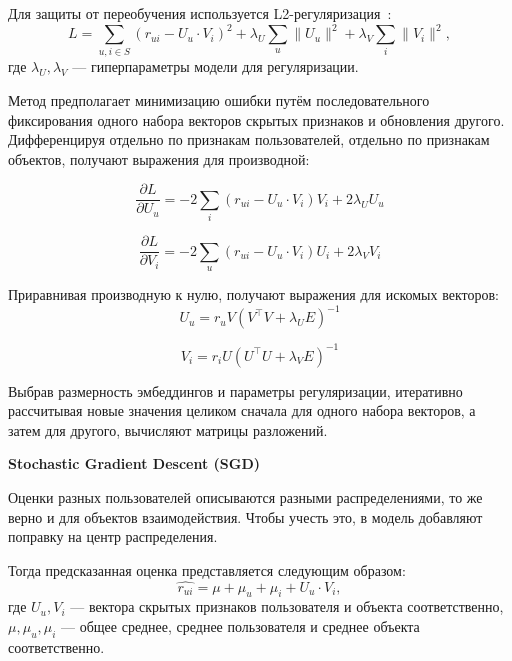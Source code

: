 Для защиты от переобучения используется L2-регуляризация~\cite{l-reg}:
\begin{equation}\label{eq:3}
        L = \sum_{u, i\in S}{(r_{ui} - U_{u} \cdot V_{i}) ^ 2} + \lambda_{U}\sum_{u}{\|U_{u}\| ^ 2} + \lambda_{V}\sum_{i}{\|V_{i}\| ^ 2},
\end{equation}
где $\lambda_{U}, \lambda_{V}$ --- гиперпараметры модели для регуляризации.


Метод предполагает минимизацию ошибки путём последовательного фиксирования одного набора векторов скрытых признаков и обновления другого.
Дифференцируя отдельно по признакам пользователей, отдельно по признакам объектов, получают выражения для производной:

\begin{equation}\label{eq:4}
        \frac{\partial L}{\partial U_{u}} = -2\sum_{i}{(r_{ui} - U_{u} \cdot V_{i})V_{i} + 2 \lambda_{U}U_{u}}
\end{equation}

\begin{equation}\label{eq:5}
        \frac{\partial L}{\partial V_{i}} = -2\sum_{u}{(r_{ui} - U_{u} \cdot V_{i})U_{i} + 2 \lambda_{V}V_{i}}
\end{equation}

Приравнивая производную к нулю, получают выражения для искомых векторов:
\begin{equation}\label{eq:6}
        U_{u} = r_{u}V(V^\intercal V + \lambda_{U} E)^{-1}
\end{equation}

\begin{equation}\label{eq:7}
        V_{i} = r_{i}U(U^\intercal U + \lambda_{V} E)^{-1}
\end{equation}

Выбрав размерность эмбеддингов и параметры регуляризации, итеративно рассчитывая новые значения целиком сначала для одного набора векторов, а затем для другого, вычисляют матрицы разложений.


\vspace{1em}
\textbf{Stochastic Gradient Descent (SGD)}

Оценки разных пользователей описываются разными распределениями, то же верно и для объектов взаимодействия.
Чтобы учесть это, в модель добавляют поправку на центр распределения.

Тогда предсказанная оценка представляется следующим образом:
\begin{equation}\label{eq:8}
    \hat{r_{ui}} = \mu + \mu_u + \mu_i+ U_{u} \cdot V_{i},
\end{equation}
где $U_{u}, V_{i}$ --- вектора скрытых признаков пользователя и объекта соответственно,
$\mu, \mu_u, \mu_i$ --- общее среднее, среднее пользователя и среднее объекта соответственно.


